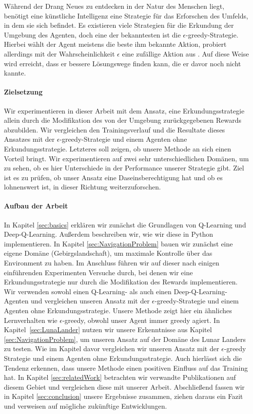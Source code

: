 Während der Drang Neues zu entdecken in der Natur des Menschen liegt, benötigt eine künstliche Intelligenz eine Strategie für das Erforschen des Umfelds, in dem sie sich befindet. Es existieren viele Strategien für die Erkundung der Umgebung des Agenten, doch eine der bekanntesten ist die $ \epsilon $-greedy-Strategie. Hierbei wählt der Agent meistens die beste ihm bekannte Aktion, probiert allerdings mit der Wahrscheinlichkeit $ \epsilon $ eine zufällige Aktion aus \cite{07_dabney2020temporallyextended, 06_sutton2018reinforcement}. Auf diese Weise wird erreicht, dass er bessere Lösungswege finden kann, die er davor noch nicht kannte.

\paragraph{Zielsetzung}
Wir experimentieren in dieser Arbeit mit dem Ansatz, eine Erkundungsstrategie allein durch die Modifikation des von der Umgebung zurückgegebenen Rewards abzubilden. Wir vergleichen den Trainingsverlauf und die Resultate dieses Ansatzes mit der $ \epsilon $-greedy-Strategie und einem Agenten ohne Erkundungsstrategie. Letzteres soll zeigen, ob unsere Methode an sich einen Vorteil bringt. Wir experimentieren auf zwei sehr unterschiedlichen Domänen, um zu sehen, ob es hier Unterschiede in der Performance unserer Strategie gibt. Ziel ist es zu prüfen, ob unser Ansatz eine Daseinsberechtigung hat und ob es lohnenswert ist, in dieser Richtung weiterzuforschen.

\paragraph{Aufbau der Arbeit}
In Kapitel \ref{sec:basics} erklären wir zunächst die Grundlagen von Q-Learning und Deep-Q-Learning. Außerdem beschreiben wir, wie wir diese in Python implementieren. In Kapitel \ref{sec:NavigationProblem} bauen wir zunächst eine eigene Domäne (Gebirgslandschaft), um maximale Kontrolle über das Environment zu haben. Im Anschluss führen wir auf dieser nach einigen einführenden Experimenten Versuche durch, bei denen wir eine Erkundungsstrategie nur durch die Modifikation des Rewards implementieren. Wir verwenden sowohl einen Q-Learning- als auch einen Deep-Q-Learning-Agenten und vergleichen unseren Ansatz mit der $ \epsilon $-greedy-Strategie und einem Agenten ohne Erkundungsstrategie. Unsere Methode zeigt hier ein ähnliches Lernverhalten wie $ \epsilon $-greedy, obwohl unser Agent immer greedy agiert. In Kapitel~\ref{sec:LunaLander} nutzen wir unsere Erkenntnisse aus Kapitel \ref{sec:NavigationProblem}, um unseren Ansatz auf der Domäne des Lunar Landers zu testen. Wie im Kapitel davor vergleichen wir unseren Ansatz mit der $ \epsilon $-greedy Strategie und einem Agenten ohne Erkundungsstrategie. Auch hierlässt sich die Tendenz erkennen, dass unsere Methode einen positiven Einfluss auf das Training hat. In Kapitel \ref{sec:relatedWork} betrachten wir verwandte Publikationen auf diesem Gebiet und vergleichen diese mit unserer Arbeit. Abschließend fassen wir in Kapitel \ref{sec:conclusion} unsere Ergebnisse zusammen, ziehen daraus ein Fazit und verweisen auf mögliche zukünftige Entwicklungen.